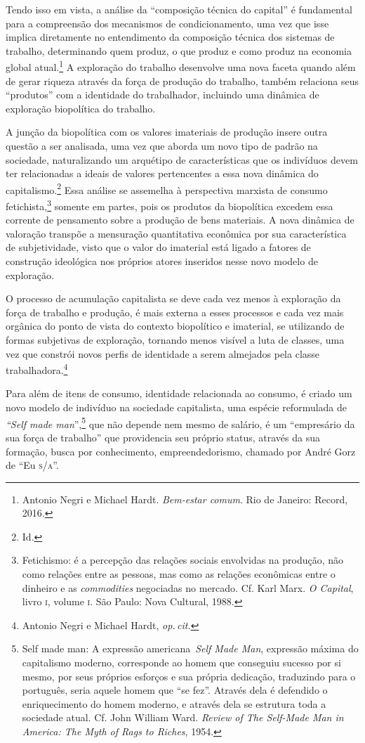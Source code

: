 Tendo isso em vista, a análise da ``composição técnica do capital'' é
fundamental para a compreensão dos mecanismos de condicionamento, uma
vez que isse implica diretamente no entendimento da composição técnica
dos sistemas de trabalho, determinando quem produz, o que produz e como
produz na economia global atual.\footnote{Antonio Negri e Michael Hardt. \emph{Bem-estar comum}. Rio de Janeiro: Record, 2016.} A exploração do
trabalho desenvolve uma nova faceta quando além de gerar riqueza através
da força de produção do trabalho, também relaciona seus ``produtos'' com
a identidade do trabalhador, incluindo uma dinâmica de exploração
biopolítica do trabalho.

A junção da biopolítica com os valores imateriais de produção insere
outra questão a ser analisada, uma vez que aborda um novo tipo de padrão
na sociedade, naturalizando um arquétipo de características que os
indivíduos devem ter relacionadas a ideais de valores pertencentes a
essa nova dinâmica do capitalismo.\footnote{Id.} Essa análise
se assemelha à perspectiva marxista de consumo fetichista,\footnote{Fetichismo:
  é a percepção das relações sociais envolvidas na produção, não como
  relações entre as pessoas, mas como as relações econômicas entre o
  dinheiro e as \emph{commodities} negociadas no mercado. Cf. Karl Marx. \emph{O Capital}, livro \textsc{i}, volume \textsc{i}. São Paulo: Nova Cultural, 1988.}
somente em partes, pois os produtos da biopolítica excedem essa corrente
de pensamento sobre a produção de bens materiais. A nova dinâmica de
valoração transpõe a mensuração quantitativa econômica por sua
característica de subjetividade, visto que o valor do imaterial está
ligado a fatores de construção ideológica nos próprios atores inseridos
nesse novo modelo de exploração.

O processo de acumulação capitalista se deve cada vez menos à exploração
da força de trabalho e produção, é mais externa a esses processos e cada
vez mais orgânica do ponto de vista do contexto biopolítico e imaterial,
se utilizando de formas subjetivas de exploração, tornando menos visível
a luta de classes, uma vez que constrói novos perfis de identidade a
serem almejados pela classe trabalhadora.\footnote{Antonio Negri e Michael Hardt, \textit{op.\,cit.}}

Para além de itens de consumo, identidade relacionada ao consumo, é
criado um novo modelo de indivíduo na sociedade capitalista, uma espécie
reformulada de \emph{``Self made man}'',\footnote{Self made man: A
  expressão americana~\emph{Self Made Man}, expressão máxima do
  capitalismo moderno, corresponde ao homem que conseguiu sucesso por si
  mesmo, por seus próprios esforços e sua própria dedicação, traduzindo
  para o português, seria aquele homem que ``se fez''. Através dela é
  defendido o enriquecimento do homem moderno, e através dela se
  estrutura toda a sociedade atual. Cf. John William Ward. \emph{Review of The Self-Made Man in America: The Myth of Rags to Riches}, 1954.} que não
depende nem mesmo de salário, é um ``empresário da sua força de
trabalho'' que providencia seu próprio status, através da sua formação,
busca por conhecimento, empreendedorismo, chamado por André Gorz de ``Eu
\textsc{s}/\textsc{a}''.

